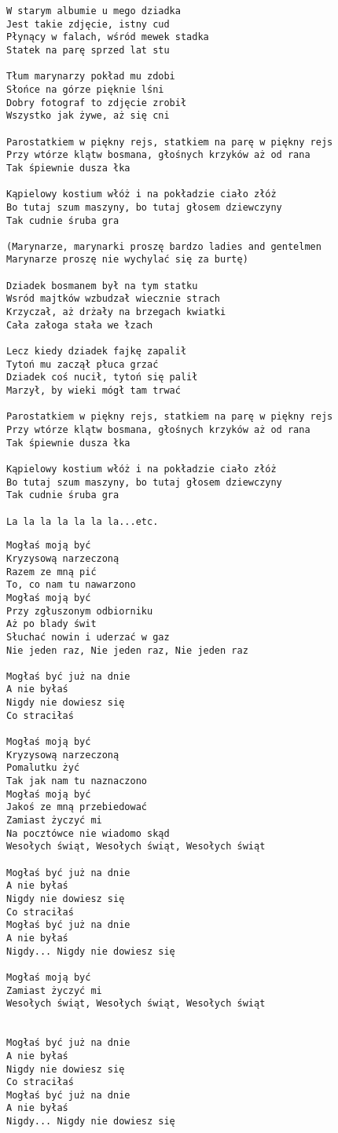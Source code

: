 \documentclass[12pt]{article}
\begin{document}
\begin{verbatim}
W starym albumie u mego dziadka
Jest takie zdjęcie, istny cud
Płynący w falach, wśród mewek stadka
Statek na parę sprzed lat stu

Tłum marynarzy pokład mu zdobi
Słońce na górze pięknie lśni
Dobry fotograf to zdjęcie zrobił
Wszystko jak żywe, aż się cni

Parostatkiem w piękny rejs, statkiem na parę w piękny rejs
Przy wtórze klątw bosmana, głośnych krzyków aż od rana
Tak śpiewnie dusza łka

Kąpielowy kostium włóż i na pokładzie ciało złóż
Bo tutaj szum maszyny, bo tutaj głosem dziewczyny
Tak cudnie śruba gra

(Marynarze, marynarki proszę bardzo ladies and gentelmen
Marynarze proszę nie wychylać się za burtę)

Dziadek bosmanem był na tym statku
Wsród majtków wzbudzał wiecznie strach
Krzyczał, aż drżały na brzegach kwiatki
Cała załoga stała we łzach

Lecz kiedy dziadek fajkę zapalił
Tytoń mu zaczął płuca grzać
Dziadek coś nucił, tytoń się palił
Marzył, by wieki mógł tam trwać

Parostatkiem w piękny rejs, statkiem na parę w piękny rejs
Przy wtórze klątw bosmana, głośnych krzyków aż od rana
Tak śpiewnie dusza łka

Kąpielowy kostium włóż i na pokładzie ciało złóż
Bo tutaj szum maszyny, bo tutaj głosem dziewczyny
Tak cudnie śruba gra

La la la la la la la...etc.
\end{verbatim}
\clearpage

\begin{verbatim}
Mogłaś moją być
Kryzysową narzeczoną
Razem ze mną pić
To, co nam tu nawarzono
Mogłaś moją być
Przy zgłuszonym odbiorniku
Aż po blady świt
Słuchać nowin i uderzać w gaz
Nie jeden raz, Nie jeden raz, Nie jeden raz

Mogłaś być już na dnie
A nie byłaś
Nigdy nie dowiesz się
Co straciłaś

Mogłaś moją być
Kryzysową narzeczoną
Pomalutku żyć
Tak jak nam tu naznaczono
Mogłaś moją być
Jakoś ze mną przebiedować
Zamiast życzyć mi
Na pocztówce nie wiadomo skąd
Wesołych świąt, Wesołych świąt, Wesołych świąt

Mogłaś być już na dnie
A nie byłaś
Nigdy nie dowiesz się
Co straciłaś
Mogłaś być już na dnie
A nie byłaś
Nigdy... Nigdy nie dowiesz się

Mogłaś moją być
Zamiast życzyć mi
Wesołych świąt, Wesołych świąt, Wesołych świąt


Mogłaś być już na dnie
A nie byłaś
Nigdy nie dowiesz się
Co straciłaś
Mogłaś być już na dnie
A nie byłaś
Nigdy... Nigdy nie dowiesz się
\end{verbatim}
\clearpage
\end{document}

